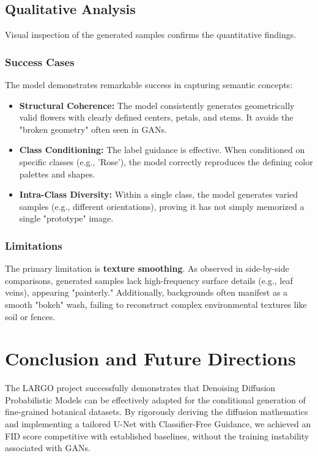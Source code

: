 \documentclass[12pt, a4paper]{article}
\begin{document}
\subsection{Qualitative Analysis}
Visual inspection of the generated samples confirms the quantitative findings.

\subsubsection{Success Cases}
The model demonstrates remarkable success in capturing semantic concepts:
\begin{itemize}
    \item \textbf{Structural Coherence:} The model consistently generates geometrically valid flowers with clearly defined centers, petals, and stems. It avoids the "broken geometry" often seen in GANs.
    \item \textbf{Class Conditioning:} The label guidance is effective. When conditioned on specific classes (e.g., 'Rose'), the model correctly reproduces the defining color palettes and shapes.
    \item \textbf{Intra-Class Diversity:} Within a single class, the model generates varied samples (e.g., different orientations), proving it has not simply memorized a single "prototype" image.
\end{itemize}

\subsubsection{Limitations}
The primary limitation is \textbf{texture smoothing}. As observed in side-by-side comparisons, generated samples lack high-frequency surface details (e.g., leaf veins), appearing "painterly." Additionally, backgrounds often manifest as a smooth "bokeh" wash, failing to reconstruct complex environmental textures like soil or fences.
\section{Conclusion and Future Directions}
The LARGO project successfully demonstrates that Denoising Diffusion Probabilistic Models can be effectively adapted for the conditional generation of fine-grained botanical datasets. By rigorously deriving the diffusion mathematics and implementing a tailored U-Net with Classifier-Free Guidance, we achieved an FID score competitive with established baselines, without the training instability associated with GANs.
\end{document}
